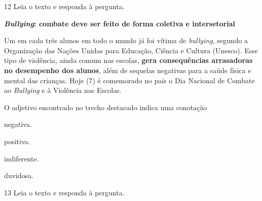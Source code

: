 \num{12} Leia o texto e responda à pergunta.

\begin{myquote}
\textbf{\textit{Bullying}: combate deve ser feito de forma coletiva e intersetorial}

Um em cada três alunos em todo o mundo já foi vítima de
\textit{bullying}, segundo a Organização das Nações Unidas para Educação,
Ciência e Cultura (Unesco). Esse tipo de violência, ainda comum nas
escolas, \textbf{gera consequências arrasadoras no desempenho dos alunos},
além de sequelas negativas para a saúde física e mental das crianças.
Hoje (7) é comemorado no país o Dia Nacional de Combate ao \textit{Bullying} e à
Violência nas Escolas.

\end{myquote}

O adjetivo encontrado no trecho destacado indica uma conotação

\begin{escolha}
  \item negativa.

  \item positiva.

  \item indiferente.

  \item duvidosa.
\end{escolha}

\pagebreak
\num{13} Leia o texto e responda à pergunta.

